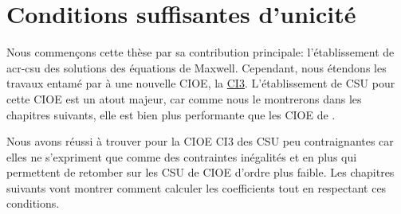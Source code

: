 \chapter{Conditions suffisantes d'unicité}
\label{sec:csu}
\minitoc
\newpage
{}
Nous commençons cette thèse par sa contribution principale: l'établissement de \gls{acr-csu} des solutions des équations de Maxwell. Cependant, nous étendons les travaux entamé par \cite{stupfel_sufficient_2011} à une nouvelle CIOE, la \hyperlink{ci3}{CI3}. L'établissement de CSU pour cette CIOE est un atout majeur, car comme nous le montrerons dans les chapitres suivants, elle est bien plus performante que les CIOE de \cite{stupfel_sufficient_2011}.



Nous avons réussi à trouver pour la CIOE CI3 des CSU peu contraignantes car elles ne s'expriment que comme des contraintes inégalités et en plus qui permettent de retomber sur les CSU de CIOE d'ordre plus faible. Les chapitres suivants vont montrer comment calculer les coefficients tout en respectant ces conditions.
